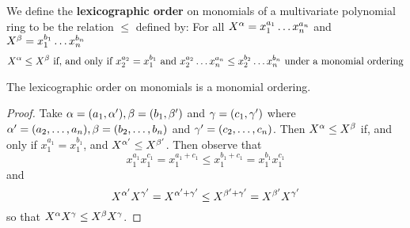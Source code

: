 \begin{definition}
  We define the \textbf{lexicographic order} on monomials of a
  multivariate polynomial ring to be the relation $\leq$ defined by:
  For all $X^\alpha=x_1^{a_1} \dots x_n^{a_n}$ and $X^\beta=x_1^{b_1} \dots
  x_n^{b_n}$
  \begin{equation*}
    X^\alpha \leq X^\beta \text{ if, and only if }
    x_2^{a_2}=x_1^{b_1} \text{ and }
    x_2^{a_2} \dots x_n^{a_n} \leq x_2^{b_2} \dots x_n^{b_n} \text{
    under a monomial ordering}
  \end{equation*}
\end{definition}

\begin{proposition}\label{proposition_7.5.3}
    The lexicographic order on monomials is a monomial ordering.
\end{proposition}
\begin{proof}
  Take $\alpha=(a_1, \alpha'), \beta= (b_1,\beta')$ and $\gamma=(c_1,\gamma')$ where
  $\alpha'=(a_2, \dots, a_n), \beta=(b_2, \dots, b_n)$ and $\gamma'=(c_2, \dots,
  c_n)$. Then $X^\alpha \leq X^\beta$ if, and only if $x_1^{a_1}=x_1^{b_1}$,
  and $X^{\alpha'} \leq X^{\beta'}$. Then observe that
  \begin{equation*}
    x_1^{a_1}x_1^{c_1}=x_1^{a_1+c_1} \leq x_1^{b_1+c_1}=x_1^{b_1}x_1^{c_1}
  \end{equation*}
  and
  \begin{equation*}
    X^{\alpha'}X^{\gamma'}=X^{\alpha'+\gamma'} \leq X^{\beta'+\gamma'}=X^{\beta'}X^{\gamma'}
  \end{equation*}
  so that $X^\alpha X^\gamma \leq X^\beta X^\gamma$.
\end{proof}
